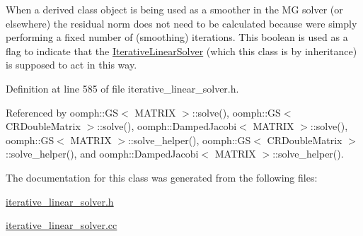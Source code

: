 When a derived class object is being used as a smoother in the MG solver (or elsewhere) the residual norm does not need to be calculated because we\textquotesingle{}re simply performing a fixed number of (smoothing) iterations. This boolean is used as a flag to indicate that the \hyperlink{classoomph_1_1IterativeLinearSolver}{Iterative\+Linear\+Solver} (which this class is by inheritance) is supposed to act in this way. 



Definition at line 585 of file iterative\+\_\+linear\+\_\+solver.\+h.



Referenced by oomph\+::\+G\+S$<$ M\+A\+T\+R\+I\+X $>$\+::solve(), oomph\+::\+G\+S$<$ C\+R\+Double\+Matrix $>$\+::solve(), oomph\+::\+Damped\+Jacobi$<$ M\+A\+T\+R\+I\+X $>$\+::solve(), oomph\+::\+G\+S$<$ M\+A\+T\+R\+I\+X $>$\+::solve\+\_\+helper(), oomph\+::\+G\+S$<$ C\+R\+Double\+Matrix $>$\+::solve\+\_\+helper(), and oomph\+::\+Damped\+Jacobi$<$ M\+A\+T\+R\+I\+X $>$\+::solve\+\_\+helper().



The documentation for this class was generated from the following files\+:\begin{DoxyCompactItemize}
\item 
\hyperlink{iterative__linear__solver_8h}{iterative\+\_\+linear\+\_\+solver.\+h}\item 
\hyperlink{iterative__linear__solver_8cc}{iterative\+\_\+linear\+\_\+solver.\+cc}\end{DoxyCompactItemize}
